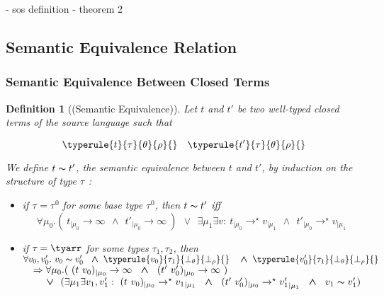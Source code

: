 \documentclass[a4paper,11pt,oneside]{article}
\theoremstyle{plain}
\newtheorem{definition}{Definition}[subsection]
\newcommand{\tmapp}[2]{(#1 ~ #2)}
\newcommand{\ty}[1][]{\tau_{#1}}
\newcommand{\bwedge}{\boldsymbol{~\wedge~}}
\newcommand{\bvee}{\boldsymbol{~\vee~}}
\newcommand{\bth}{\bot_\theta}
\newcommand{\brh}{\bot_\rho}
\newcommand{\evalstar}[4]{~#1_{|\mu_#2} \rightarrow^{\star} #3_{|\mu_#4} ~}
\newcommand{\evalinfty}[2]{~#1_{|#2} \rightarrow \infty ~}
\newcommand{\eqv}[1]{#1 \thicksim #1'}
\begin{document}
- sos definition
- theorem 2	
	
\subsection{Semantic Equivalence Relation}

\subsubsection*{Semantic Equivalence Between Closed Terms}

\label{semantic equivalence}
\begin{definition}[(Semantic Equivalence)]
	Let $t$ and $t'$ be two well-typed closed terms of the source 
	language such that 
	
	$$
		\typerule{t}{\tau}{\theta}{\rho}{} \quad \typerule{t'}{\tau}{\theta}{\rho}{} 
	$$

	We define $\eqv{t}$, the \textit{semantic equivalence} between $t$ and $t'$, 
	by induction on the structure of type $\ty$ :
	
	\begin{itemize}
		\item[$(\alpha)$]

			if $\ty{} = \ty{}^0$ for some base type $\ty{}^0$, then $\eqv{t}$ iff
			$$	\forall \mu_0.(\evalinfty{t}{\mu_0} \bwedge \evalinfty{t'}{\mu_0})~
					\bvee ~ \exists \mu_1 \exists v: 
					\evalstar{t}{0}{v}{1} \bwedge \evalstar{t'}{0}{v}{1} $$
		
		\item[$(\beta)$]
			if $\ty = \tyarr$ for some types $\ty[1], \ty[2]$,
			then\\[0.2cm]
			$\hspace*{0em}\forall v_0, v'_0. ~ \eqv{v_0} ~ 
			\bwedge \typerule{v_0}{\ty[1]}{\bth}{\brh}{} ~~
			\bwedge \typerule{v'_0}{\ty[1]}{\bth}{\brh}{} $ \\[0.2cm]
			$\hspace*{1em}
			\Rightarrow \forall\mu_0.(\evalinfty{\tmapp{t}{v_0}}{\mu_0}
			\bwedge\evalinfty{\tmapp{t'}{v'_0}}{\mu_0})$\\[0.2cm]
			$\hspace*{2em}\bvee~(\exists \mu_1 \exists v_1, v'_1 : 
			 	\evalstar{\tmapp{t}{v_0}}{0}{{v_1}}{1} 
				\bwedge \evalstar{\tmapp{t'}{v'_0}}{0}{{v'_1}}{1}
				\bwedge~\eqv{v_1})$				
	\end{itemize}
	\end{definition}
\end{document}
